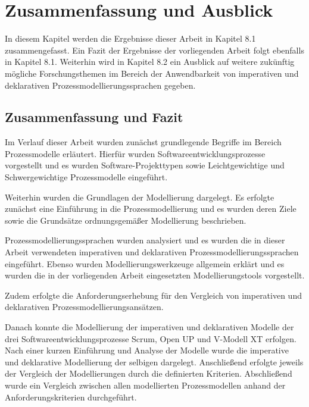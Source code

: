 \chapter{Zusammenfassung und Ausblick}\label{sec:chapter8}
 In diesem Kapitel werden die Ergebnisse dieser Arbeit in Kapitel 8.1 zusammengefasst. Ein Fazit der Ergebnisse der vorliegenden Arbeit folgt ebenfalls in Kapitel 8.1. Weiterhin wird in Kapitel 8.2 ein Ausblick auf weitere zukünftig mögliche Forschungsthemen im Bereich der Anwendbarkeit von imperativen und deklarativen Prozessmodellierungssprachen gegeben.

\section{Zusammenfassung und Fazit}

Im Verlauf dieser Arbeit wurden zunächst grundlegende Begriffe im Bereich Prozessmodelle erläutert. Hierfür wurden Softwareentwicklungsprozesse vorgestellt und es wurden Software-Projekttypen sowie Leichtgewichtige und Schwergewichtige Prozessmodelle eingeführt.\newline

Weiterhin wurden die Grundlagen der Modellierung dargelegt. Es erfolgte zunächst eine Einführung in die Prozessmodellierung und es wurden deren Ziele sowie die Grundsätze ordnungsgemäßer Modellierung beschrieben.\newline

Prozessmodellierungssprachen wurden analysiert und es wurden die in dieser Arbeit verwendeten imperativen und deklarativen Prozessmodellierungssprachen eingeführt. Ebenso wurden Modellierungswerkzeuge allgemein erklärt und es wurden die in der vorliegenden Arbeit eingesetzten Modellierungstools vorgestellt.\newline

Zudem erfolgte die Anforderungserhebung für den Vergleich von imperativen und deklarativen Prozessmodellierungsansätzen.\newline

Danach konnte die Modellierung der imperativen und deklarativen Modelle der drei Softwareentwicklungsprozesse Scrum, Open UP und V-Modell XT erfolgen. Nach einer kurzen Einführung und Analyse der Modelle wurde die imperative und deklarative Modellierung der selbigen dargelegt. Anschließend erfolgte jeweils der Vergleich der Modellierungen durch die definierten Kriterien. Abschließend wurde ein Vergleich zwischen allen modellierten Prozessmodellen anhand der Anforderungskriterien durchgeführt. \newline


